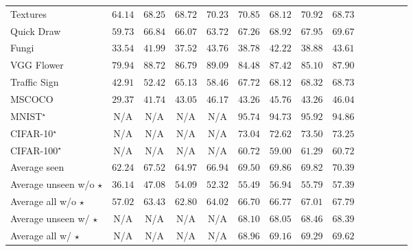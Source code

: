 \begin{table*}[t!]
{\begin{tabular}{lccccccccccccc}
    Textures &\quad\; $64.14$ &\quad\; $68.25$ &\quad\; $68.72$ &\quad\; $70.23$ &\quad\; $70.85$ &\quad\; $68.12$ &\quad\; $\mathbf{70.92}$ &\quad\; $68.73$\\
    Quick Draw &\quad\; $59.73$ &\quad\; $66.84$ &\quad\; $66.07$ &\quad\; $63.72$ &\quad\; $67.26$ &\quad\; $68.92$ &\quad\; $67.95$ &\quad\; $\mathbf{69.67}$\\
    Fungi &\quad\; $33.54$ &\quad\; $41.99$ &\quad\; $37.52$ &\quad\; $43.76$ &\quad\; $38.78$ &\quad\; $42.22$ &\quad\; $38.88$ &\quad\; $\mathbf{43.61}$\\
    VGG Flower &\quad\; $79.94$ &\quad\; $88.72$ &\quad\; $86.79$ &\quad\; $89.09$ &\quad\; $84.48$ &\quad\; $87.42$ &\quad\; $85.10$ &\quad\; $\mathbf{87.90}$\\
    \midrule
    Traffic Sign &\quad\; $42.91$ &\quad\; $52.42$ &\quad\; $65.13$ &\quad\; $58.46$ &\quad\; $67.72$ &\quad\; $68.12$ &\quad\; $68.32$ &\quad\; $\mathbf{68.73}$\\
    MSCOCO &\quad\; $29.37$ &\quad\; $41.74$ &\quad\; $43.05$ &\quad\; $46.17$ &\quad\; $43.26$ &\quad\; $45.76$ &\quad\; $43.26$ &\quad\; $\mathbf{46.04}$\\
    MNIST$^{\star}$ &\quad\; N/A &\quad\; N/A &\quad\; N/A &\quad\; N/A &\quad\; $95.74$ &\quad\; $94.73$ &\quad\; $\mathbf{95.92}$ &\quad\; $94.86$\\
    CIFAR-10$^{\star}$ &\quad\; N/A &\quad\; N/A &\quad\; N/A &\quad\; N/A &\quad\; $73.04$ &\quad\; $72.62$ &\quad\; $\mathbf{73.50}$ &\quad\; $73.25$\\
    CIFAR-100$^{\star}$ &\quad\; N/A &\quad\; N/A &\quad\; N/A &\quad\; N/A &\quad\; $60.72$ &\quad\; $59.00$ &\quad\; $\mathbf{61.29}$ &\quad\; $60.72$\\
    \midrule
    Average seen &\quad\; $62.24$ &\quad\; $67.52$ &\quad\; $64.97$ &\quad\; $66.94$ &\quad\; $69.50$ &\quad\; $69.86$ &\quad\; $69.82$ &\quad\; $\mathbf{70.39}$\\
    \midrule
    Average unseen w/o $\star$ &\quad\; $36.14$ &\quad\; $47.08$ &\quad\; $54.09$ &\quad\; $52.32$ &\quad\; $55.49$ &\quad\; $56.94$ &\quad\; $55.79$ &\quad\; $\mathbf{57.39}$\\
    Average all w/o $\star$ &\quad\; $57.02$ &\quad\; $63.43$ &\quad\; $62.80$ &\quad\; $64.02$ &\quad\; $66.70$ &\quad\; $66.77$ &\quad\; $67.01$ &\quad\; $\mathbf{67.79}$\\
    \midrule
    Average unseen w/ $\star$ &\quad\; N/A &\quad\; N/A &\quad\; N/A &\quad\; N/A &\quad\; $68.10$ &\quad\; $68.05$ &\quad\; $\mathbf{68.46}$ &\quad\; $68.39$\\
    Average all w/ $\star$ &\quad\; N/A &\quad\; N/A &\quad\; N/A &\quad\; N/A &\quad\; $68.96$ &\quad\; $69.16$ &\quad\; $69.29$ &\quad\; $\mathbf{69.62}$\\
    \bottomrule
  \end{tabular}
  }
  \label{tab:all_metadataset}
\end{table*}



